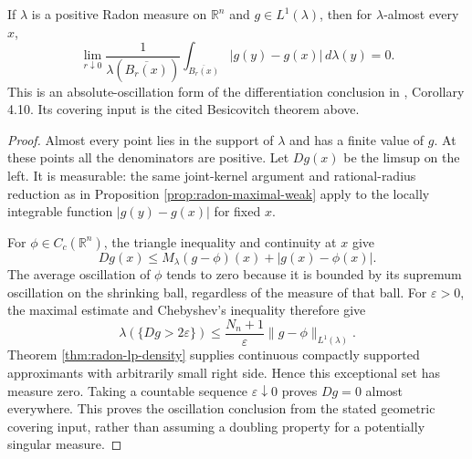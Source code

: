 \begin{theorem}\label{thm:radon-absolute-oscillation}
If $\lambda$ is a positive Radon measure on $\mathbb R^n$ and $g\in L^1(\lambda)$, then for $\lambda$-almost every $x$,
\[
 \lim_{r\downarrow0}\frac{1}{\lambda(\overline{B_r(x)})}
       \int_{\overline{B_r(x)}}|g(y)-g(x)|\,d\lambda(y)=0.
\]
This is an absolute-oscillation form of the differentiation conclusion in \cite{Sim18}, Corollary 4.10. Its covering input is the cited Besicovitch theorem above.
\end{theorem}
\begin{proof}
Almost every point lies in the support of $\lambda$ and has a finite value of $g$. At these points all the denominators are positive. Let $Dg(x)$ be the limsup on the left. It is measurable: the same joint-kernel argument and rational-radius reduction as in Proposition \ref{prop:radon-maximal-weak} apply to the locally integrable function $|g(y)-g(x)|$ for fixed $x$.

For $\phi\in C_c(\mathbb R^n)$, the triangle inequality and continuity at $x$ give
\[
 Dg(x)\leq M_\lambda(g-\phi)(x)+|g(x)-\phi(x)|.
\]
The average oscillation of $\phi$ tends to zero because it is bounded by its supremum oscillation on the shrinking ball, regardless of the measure of that ball. For $\varepsilon>0$, the maximal estimate and Chebyshev's inequality therefore give
\[
 \lambda(\{Dg>2\varepsilon\})
 \leq\frac{N_n+1}{\varepsilon}\|g-\phi\|_{L^1(\lambda)}.
\]
Theorem \ref{thm:radon-lp-density} supplies continuous compactly supported approximants with arbitrarily small right side. Hence this exceptional set has measure zero. Taking a countable sequence $\varepsilon\downarrow0$ proves $Dg=0$ almost everywhere. This proves the oscillation conclusion from the stated geometric covering input, rather than assuming a doubling property for a potentially singular measure.
\end{proof}

